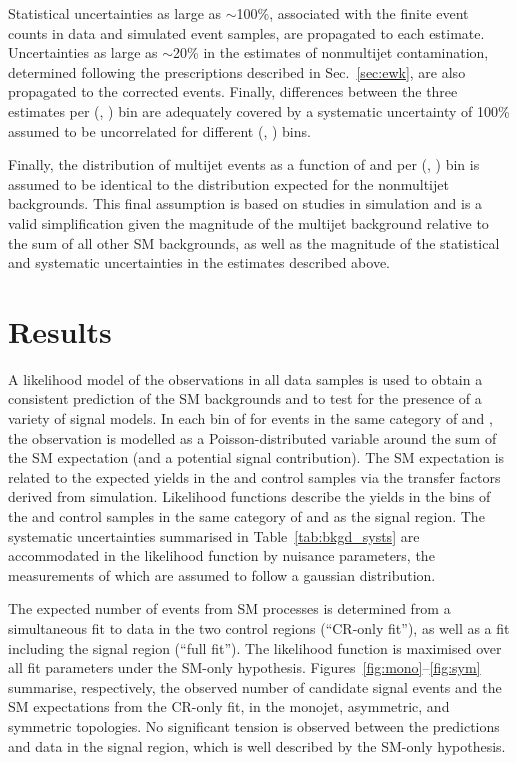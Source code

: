 Statistical uncertainties as large as $\sim$100\%, associated with the
finite event counts in data and simulated event samples, are
propagated to each estimate. Uncertainties as large as $\sim$20\% in
the estimates of nonmultijet contamination, determined following the
prescriptions described in Sec.~\ref{sec:ewk}, are also propagated to
the corrected events. Finally, differences between the three estimates
per (\njet, \scalht) bin are adequately covered by a systematic
uncertainty of 100\% assumed to be uncorrelated for different (\njet,
\scalht) bins.

Finally, the distribution of multijet events as a function of \nb and
\mht per (\njet, \scalht) bin is assumed to be identical to the
distribution expected for the nonmultijet backgrounds. This final
assumption is based on studies in simulation and is a valid
simplification given the magnitude of the multijet background relative
to the sum of all other SM backgrounds, as well as the magnitude of
the statistical and systematic uncertainties in the estimates
described above.


\section{Results}
\label{sec:result}

A likelihood model of the observations in all data samples is used to
obtain a consistent prediction of the SM backgrounds and to test for
the presence of a variety of signal models.  In each bin of \scalht
for events in the same category of \njet and \nb, the observation is
modelled as a Poisson-distributed variable around the sum of the SM
expectation (and a potential signal contribution). The SM expectation
is related to the expected yields in the \mj and \mmj control samples
via the transfer factors derived from simulation. Likelihood functions
describe the yields in the \scalht bins of the \mj and \mmj control
samples in the same category of \njet and \nb as the signal
region. The systematic uncertainties summarised in
Table~\ref{tab:bkgd_systs} are accommodated in the likelihood function
by nuisance parameters, the measurements of which are assumed to
follow a gaussian distribution.

The expected number of events from SM processes is determined from a
simultaneous fit to data in the two control regions (``CR-only fit''),
as well as a fit including the signal region (``full fit''). The
likelihood function is maximised over all fit parameters under the
SM-only hypothesis. Figures~\ref{fig:mono}--\ref{fig:sym} summarise,
respectively, the observed number of candidate signal events and the
SM expectations from the CR-only fit, in the monojet, asymmetric, and
symmetric topologies. No significant tension is observed between the
predictions and data in the signal region, which is well described by
the SM-only hypothesis.

